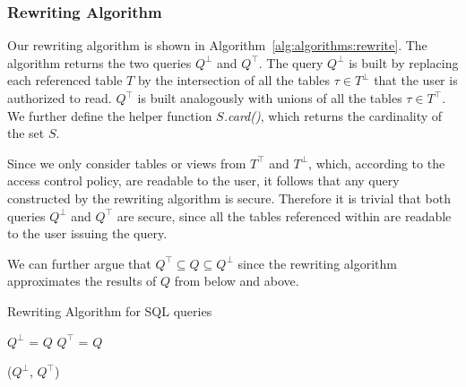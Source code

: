 \subsubsection{Rewriting Algorithm}
%
Our rewriting algorithm is shown in Algorithm~\ref{alg:algorithms:rewrite}.
%
The algorithm returns the two queries $Q^\bot$ and $Q^\top$.
%
The query $Q^\bot$ is built by replacing each referenced table $T$ by the intersection of all the tables $\tau \in T^\bot$ that the user is authorized to read.
%
$Q^\top$ is built analogously with unions of all the tables $\tau \in T^\top$.
%
We further define the helper function \emph{$S$.card()}, which returns the cardinality of the set $S$.

Since we only consider tables or views from $T^\top$ and $T^\bot$, which, according to the access control policy, are readable to the user, it follows that any query constructed by the rewriting algorithm is secure.
%
Therefore it is trivial that both queries $Q^\bot$ and $Q^\top$ are secure, since all the tables referenced within are readable to the user issuing the query.

We can further argue that $Q^\top \subseteq Q \subseteq Q^\bot$ since the rewriting algorithm approximates the results of $Q$ from below and above. 
%
\begin{algorithm}
\caption{Rewriting Algorithm for SQL queries}
\label{alg:algorithms:rewrite}
	\SetAlgoLined
	$Q^\bot$ = $Q$\;
	$Q^\top$ = $Q$\;

     \Return ($Q^\bot$, $Q^\top$)\;
\end{algorithm}

